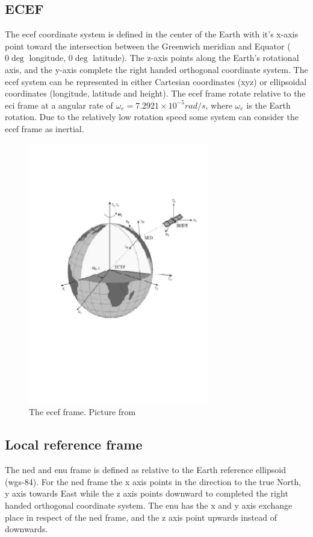 \subsection{ECEF}
The \gls{ecef} coordinate system is defined in the center of the Earth with it's x-axis point toward the intersection between the Greenwich meridian and Equator ( $0\deg $ longitude, $0\deg $ latitude). The z-axis points along the Earth's rotational axis, and the y-axis complete the right handed orthogonal coordinate system. The \gls{ecef} system can be represented in either Cartesian coordinates (xyz) or ellipsoidal coordinates (longitude, latitude and height). The \gls{ecef} frame rotate relative to the \gls{eci} frame at a angular rate of $\omega_e = 7.2921 \times 10^{-5}rad/s$, where $\omega_e$ is the Earth rotation. Due to the relatively low rotation speed some system can consider the \gls{ecef} frame as inertial.
\begin{figure}[H]
	\centering
		\includegraphics[width=0.7\textwidth]{figs/ECEF-Frame.jpg}
		\caption{The \gls{ecef} frame. Picture from \citep{fossen2011handbook}}
		\label{figure:ECEF}
\end{figure}
\subsection{Local reference frame}
The \gls{ned} and \gls{enu} frame is defined as relative to the Earth reference ellipsoid (\gls{wgs-84}). For the \gls{ned} frame the x axis points in the direction to the true North, y axis towards East while the z axis points downward to completed the right handed orthogonal coordinate system. The \gls{enu} has the x and y axis exchange place in respect of the \gls{ned} frame, and the z axis point upwards instead of downwards.
